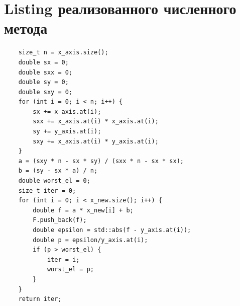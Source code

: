 \section{Listing реализованного численного метода}
\tiny
\begin{verbatim}
    size_t n = x_axis.size();
    double sx = 0;
    double sxx = 0;
    double sy = 0;
    double sxy = 0;
    for (int i = 0; i < n; i++) {
        sx += x_axis.at(i);
        sxx += x_axis.at(i) * x_axis.at(i);
        sy += y_axis.at(i);
        sxy += x_axis.at(i) * y_axis.at(i);
    }
    a = (sxy * n - sx * sy) / (sxx * n - sx * sx);
    b = (sy - sx * a) / n;
    double worst_el = 0;
    size_t iter = 0;
    for (int i = 0; i < x_new.size(); i++) {
        double f = a * x_new[i] + b;
        F.push_back(f);
        double epsilon = std::abs(f - y_axis.at(i));
        double p = epsilon/y_axis.at(i);
        if (p > worst_el) {
            iter = i;
            worst_el = p;
        }
    }
    return iter;
\end{verbatim}
\normalsize


